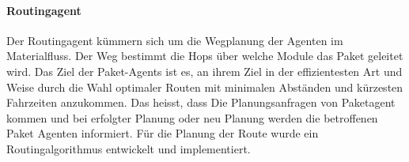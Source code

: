 \paragraph{Routingagent}
Der Routingagent kümmern sich um die Wegplanung der Agenten im Materialfluss. Der Weg bestimmt die Hops über welche Module das Paket geleitet wird.
Das Ziel der Paket-Agents ist es, an ihrem Ziel in der effizientesten Art und Weise durch die Wahl optimaler Routen 
mit minimalen Abständen und kürzesten Fahrzeiten anzukommen. Das heisst, dass Die Planungsanfragen
von Paketagent kommen und bei erfolgter Planung oder neu Planung werden die betroffenen Paket Agenten informiert. Für die Planung der 
Route wurde ein Routingalgorithmus entwickelt und implementiert.

